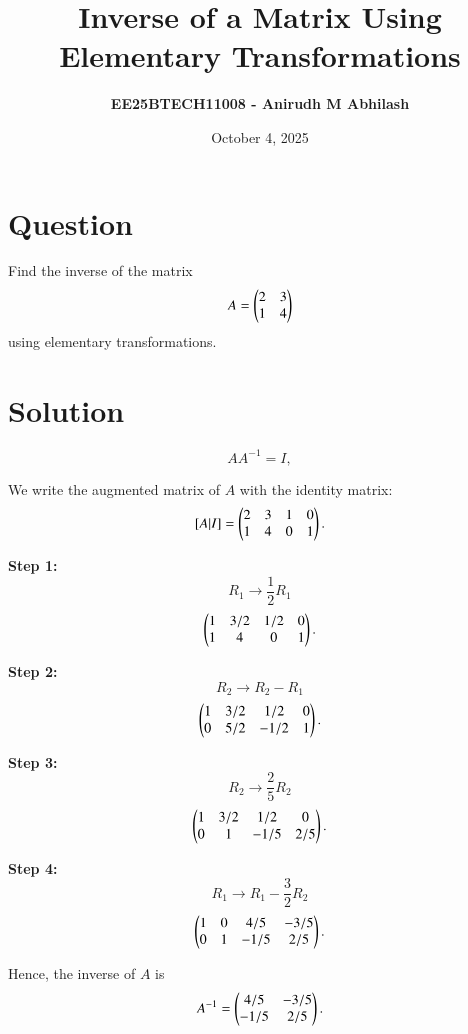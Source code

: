 \documentclass[12pt]{article}
\title{\textbf{Inverse of a Matrix Using Elementary Transformations}}
\author{\textbf{EE25BTECH11008 - Anirudh M Abhilash}}
\date{October 4, 2025}
\begin{document}
\maketitle

\section*{Question}

Find the inverse of the matrix 
\[
A = \begin{pmatrix}2 & 3 \\ 1 & 4\end{pmatrix}
\]
using elementary transformations.

\section*{Solution}
\[
A A^{-1} = I,
\]

We write the augmented matrix of $A$ with the identity matrix:
\[
[A | I] = \begin{pmatrix}2 & 3 & 1 & 0 \\ 1 & 4 & 0 & 1\end{pmatrix}.
\]

\textbf{Step 1:}
\[
R_1 \to \frac{1}{2} R_1
\]
\[
\begin{pmatrix}1 & 3/2 & 1/2 & 0 \\ 1 & 4 & 0 & 1\end{pmatrix}.
\]

\textbf{Step 2:}
\[
R_2 \to R_2 - R_1
\]
\[
\begin{pmatrix}1 & 3/2 & 1/2 & 0 \\ 0 & 5/2 & -1/2 & 1\end{pmatrix}.
\]

\textbf{Step 3:}
\[
R_2 \to \frac{2}{5} R_2
\]
\[
\begin{pmatrix}1 & 3/2 & 1/2 & 0 \\ 0 & 1 & -1/5 & 2/5\end{pmatrix}.
\]

\textbf{Step 4:}
\[
R_1 \to R_1 - \frac{3}{2} R_2
\]
\[
\begin{pmatrix}1 & 0 & 4/5 & -3/5 \\ 0 & 1 & -1/5 & 2/5\end{pmatrix}.
\]

Hence, the inverse of $A$ is
\[
A^{-1} = \begin{pmatrix}4/5 & -3/5 \\ -1/5 & 2/5\end{pmatrix}.
\]
\end{document}
